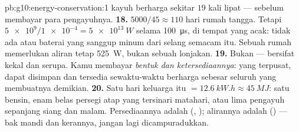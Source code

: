 \begin{solution}{pb:g10:energy-conservation:1}
kayuh berharga sekitar $19$ kali lipat --- sebelum membayar para
pengayuhnya.
\textbf{18.} $5000/45 \approx 110$ hari rumah tangga. Tetapi
$\num{5e9}/\num{1e-4} = \qty{5e13}{W}$ selama \qty{100}{\micro s}, di
tempat yang acak: tidak ada  atau baterai yang sanggup minum
dari selang semacam itu. Sebuah rumah memerlukan aliran tetap
\qty{525}{W}, bukan sebuah lonjakan.
\textbf{19.} Bukan  ---  bersifat kekal dan serupa. Kamu
membayar \emph{bentuk dan ketersediaannya}:  yang terpusat, dapat
disimpan dan tersedia sewaktu-waktu berharga sebesar seluruh  yang membuatnya demikian.
\textbf{20.} Satu hari keluarga itu $= \qty{12.6}{kW.h} \approx
\qty{45}{MJ}$: satu  bensin, enam belas  persegi atap yang
tersinari matahari, atau lima pengayuh sepanjang siang dan malam.
Persediaannya adalah  (, ); alirannya adalah
 () --- bak mandi dan kerannya, jangan lagi dicampuradukkan.
\end{solution}
